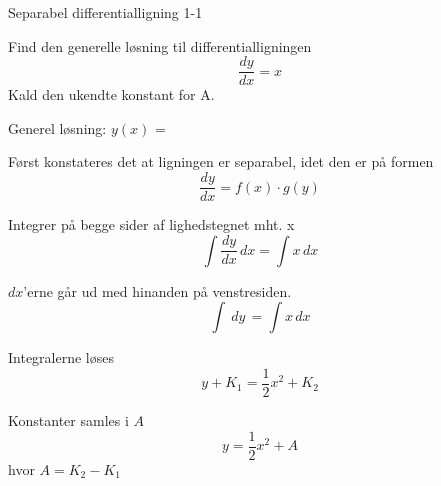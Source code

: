 \documentclass{article}
\begin{document}
\tableofcontents
\newpage

\begin{exercise}{Separabel differentialligning 1-1}


Find den generelle løsning til differentialligningen 
\[
\frac{dy}{dx} = x 
\]
Kald den ukendte konstant for A.

Generel løsning: $y(x)$ = 

\hint

Først konstateres det at ligningen er separabel, idet den er på formen
\[
\frac{dy}{dx} = f(x) \cdot g(y)
\]


\hint

Integrer på begge sider af lighedstegnet mht. x
\[
\int\frac{dy}{dx}\, dx= \int x\,dx
\]

\hint

$dx$'erne går ud med hinanden på venstresiden.
\[
\int\ dy\,= \int x\,dx
\]

\hint

Integralerne løses
\[
y + K_1 = \frac{1}{2} x^2 + K_2
\]


\hint

Konstanter samles i $A$
\[
y = \frac{1}{2}x^2 + A
\]
hvor $A=K_2-K_1$

\end{exercise}


\newpage
\end{document}
